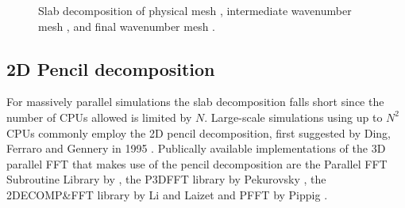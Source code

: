 \documentclass[11pt, oneside]{article}
\begin{document}
\begin{figure}[t!]
{  \label{slabsubfig1}
}
\caption{Slab decomposition of physical mesh , intermediate wavenumber mesh , and final wavenumber mesh .  }
\label{fig:Slabdecomp}
\end{figure}

\subsection{2D Pencil decomposition}
\label{pencil2D}

For massively parallel simulations the slab decomposition falls short since the number of CPUs allowed is limited by $N$. Large-scale simulations using up to $N^2$ CPUs commonly employ the 2D pencil decomposition, first suggested by Ding, Ferraro and Gennery in 1995 \cite{Ding95}. Publically available implementations of the 3D parallel FFT that makes use of the pencil decomposition are the Parallel FFT Subroutine Library by \cite{PlimptonFFT}, the P3DFFT library by Pekurovsky \cite{p3dfft, Pekurovsky2012}, the 2DECOMP\&FFT library by Li and Laizet \cite{Li2010} and PFFT by Pippig \cite{Pi13}.
\end{document}

